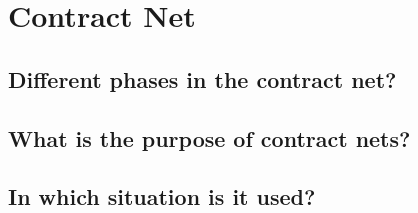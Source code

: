 \section{Contract Net}
\subsection{Different phases in the contract net?}
\subsection{What is the purpose of contract nets?}
\subsection{In which situation is it used?}
